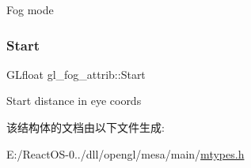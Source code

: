 Fog mode \mbox{\label{structgl__fog__attrib_ac652c0262b8d1733fa4a77ad49b41327}} 
\subsubsection{\texorpdfstring{Start}{Start}}
{\footnotesize\ttfamily G\+Lfloat gl\+\_\+fog\+\_\+attrib\+::\+Start}

Start distance in eye coords 

该结构体的文档由以下文件生成\+:\begin{DoxyCompactItemize}
\item 
E\+:/\+React\+O\+S-\/0../dll/opengl/mesa/main/\hyperlink{mtypes_8h}{mtypes.\+h}\end{DoxyCompactItemize}
